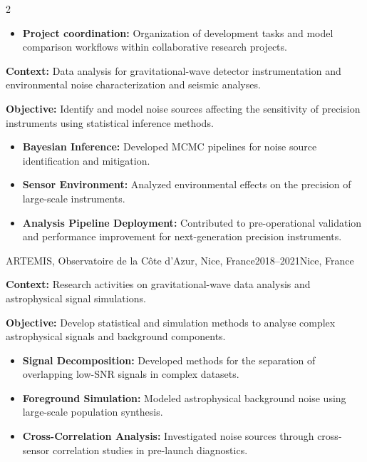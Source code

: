 \documentclass[8pt,a4paper,ragged2e,withhyper]{../_shared/altacv}
\begin{document}
\begin{paracol}{2}
\begin{itemize}
\item \textbf{Project coordination:} Organization of development tasks and model comparison workflows within collaborative research projects.
\end{itemize}
\divider
{}

\textbf{Context:} Data analysis for gravitational-wave detector instrumentation and environmental noise characterization and seismic analyses.

\textbf{Objective:} Identify and model noise sources affecting the sensitivity of precision instruments using statistical inference methods.

\begin{itemize}
\item \textbf{Bayesian Inference:} Developed MCMC pipelines for noise source identification and mitigation.
\item \textbf{Sensor Environment:} Analyzed environmental effects on the precision of large-scale instruments.
\item \textbf{Analysis Pipeline Deployment:} Contributed to pre-operational validation and performance improvement for next-generation precision instruments.
\end{itemize}
\divider
{}
{ARTEMIS, Observatoire de la Côte d'Azur, Nice, France}{2018--2021}{Nice, France}

\textbf{Context:} Research activities on gravitational-wave data analysis and astrophysical signal simulations.

\textbf{Objective:} Develop statistical and simulation methods to analyse complex astrophysical signals and background components.

\begin{itemize}
    \item \textbf{Signal Decomposition:} Developed methods for the separation of overlapping low-SNR signals in complex datasets.
    \item \textbf{Foreground Simulation:} Modeled astrophysical background noise using large-scale population synthesis.
    \item \textbf{Cross-Correlation Analysis:} Investigated noise sources through cross-sensor correlation studies in pre-launch diagnostics.
\end{itemize}






\end{paracol}
\end{document}
